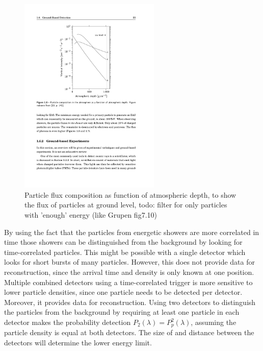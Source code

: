 \begin{figure}
    \centering
    \includegraphics[width=0.6\textwidth]
                    {plots/experiment/particle_density}
    \caption{Particle flux composition as function of atmospheric depth, to show the flux of particles at ground level, todo: filter for only particles with 'enough' energy (like Grupen fig7.10)}
    \label{fig:particle_density}
\end{figure}

By using the fact that the particles from energetic showers are more correlated in time those showers can be distinguished from the background by looking for time-correlated particles. This might be possible with a single detector which looks for short bursts of many particles. However, this does not provide data for reconstruction, since the arrival time and density is only known at one position. Multiple combined detectors using a time-correlated trigger is more sensitive to lower particle densities, since one particle needs to be detected per detector. Moreover, it provides data for reconstruction. Using two detectors to distinguish the particles from the background by requiring at least one particle in each detector makes the probability detection $P_2(\lambda) = P_p^2(\lambda)$, assuming the particle density is equal at both detectors. The size of and distance between the detectors will determine the lower energy limit.

